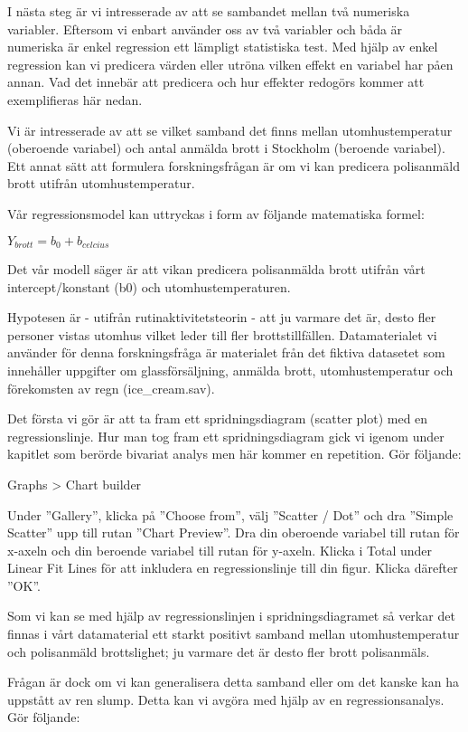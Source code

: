\documentclass[
]{book}
\begin{document}
I nästa steg är vi intresserade av att se sambandet mellan två numeriska variabler. Eftersom vi enbart använder oss av två variabler och båda är numeriska är enkel regression ett lämpligt statistiska test. Med hjälp av enkel regression kan vi predicera värden eller utröna vilken effekt en variabel har påen annan. Vad det innebär att predicera och hur effekter redogörs kommer att exemplifieras här nedan.

Vi är intresserade av att se vilket samband det finns mellan utomhustemperatur (oberoende variabel) och antal anmälda brott i Stockholm (beroende variabel). Ett annat sätt att formulera forskningsfrågan är om vi kan predicera polisanmäld brott utifrån utomhustemperatur.

Vår regressionsmodel kan uttryckas i form av följande matematiska formel:

\(Y_{brott} = b_0 + b_{celcius}\)

Det vår modell säger är att vikan predicera polisanmälda brott utifrån vårt intercept/konstant (b0) och utomhustemperaturen.

Hypotesen är - utifrån rutinaktivitetsteorin - att ju varmare det är, desto fler personer vistas utomhus vilket leder till fler brottstillfällen. Datamaterialet vi använder för denna forskningsfråga är materialet från det fiktiva datasetet som innehåller uppgifter om glassförsäljning, anmälda brott, utomhustemperatur och förekomsten av regn (ice\_cream.sav).

Det första vi gör är att ta fram ett spridningsdiagram (scatter plot) med en regressionslinje. Hur man tog fram ett spridningsdiagram gick vi igenom under kapitlet som berörde bivariat analys men här kommer en repetition. Gör följande:

Graphs \textgreater{} Chart builder

Under ''Gallery'', klicka på ''Choose from'', välj ''Scatter / Dot'' och dra ''Simple Scatter'' upp till rutan ''Chart Preview''. Dra din oberoende variabel till rutan för x-axeln och din beroende variabel till rutan för y-axeln. Klicka i Total under Linear Fit Lines för att inkludera en regressionslinje till din figur. Klicka därefter ''OK''.

Som vi kan se med hjälp av regressionslinjen i spridningsdiagramet så verkar det finnas i vårt datamaterial ett starkt positivt samband mellan utomhustemperatur och polisanmäld brottslighet; ju varmare det är desto fler brott polisanmäls.

Frågan är dock om vi kan generalisera detta samband eller om det kanske kan ha uppstått av ren slump. Detta kan vi avgöra med hjälp av en regressionsanalys. Gör följande:
\end{document}
